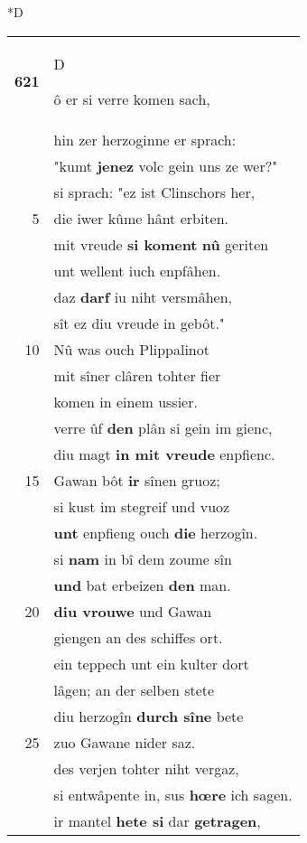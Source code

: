 \documentclass[8pt,a4paper,notitlepage]{article}
\begin{document}
\begin{table}[ht]
\begin{minipage}[t]{0.5\linewidth}
\small
\begin{center}*D
\end{center}
\begin{tabular}{rl}
\textbf{621} & \begin{large}D\end{large}ô er si verre komen sach,\\ 
 & hin zer herzoginne er sprach:\\ 
 & "kumt \textbf{jenez} volc gein uns ze wer?"\\ 
 & si sprach: "ez ist Clinschors her,\\ 
5 & die iwer kûme hânt erbiten.\\ 
 & mit vreude \textbf{si koment} \textbf{nû} geriten\\ 
 & unt wellent iuch enpfâhen.\\ 
 & daz \textbf{darf} iu niht versmâhen,\\ 
 & sît ez diu vreude in gebôt."\\ 
10 & Nû was ouch Plippalinot\\ 
 & mit sîner clâren tohter fier\\ 
 & komen in einem ussier.\\ 
 & verre ûf \textbf{den} plân si gein im gienc,\\ 
 & diu magt \textbf{in mit vreude} enpfienc.\\ 
15 & Gawan bôt \textbf{ir} sînen gruoz;\\ 
 & si kust im stegreif und vuoz\\ 
 & \textbf{unt} enpfieng ouch \textbf{die} herzogîn.\\ 
 & si \textbf{nam} in bî dem zoume sîn\\ 
 & \textbf{und} bat erbeizen \textbf{den} man.\\ 
20 & \textbf{diu vrouwe} und Gawan\\ 
 & giengen an des schiffes ort.\\ 
 & ein teppech unt ein kulter dort\\ 
 & lâgen; an der selben stete\\ 
 & diu herzogîn \textbf{durch sîne} bete\\ 
25 & zuo Gawane nider saz.\\ 
 & des verjen tohter niht vergaz,\\ 
 & si entwâpente in, sus \textbf{hœre} ich sagen.\\ 
 & ir mantel \textbf{hete si} dar \textbf{getragen},\\ 

\end{tabular}
\end{minipage}
\end{table}
\end{document}
